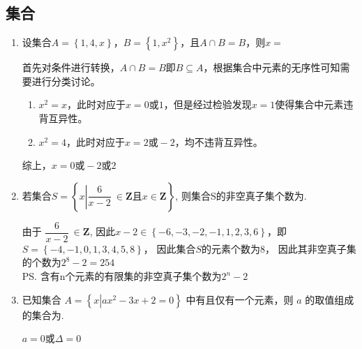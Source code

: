 \subsection*{集合}
\begin{enumerate}
    \item 设集合$A = \left\{1, 4, x\right\}$，$B = \left\{1, x^2\right\}$，且$A \cap B = B$，则$x = $
    \begin{jieda}
        首先对条件进行转换，$A \cap B = B$即$B \subseteq A$，根据集合中元素的无序性可知需要进行分类讨论。
        \begin{enumerate}
            \item $x^2 = x$，此时对应于$x = 0 \mbox{或} 1$，但是经过检验发现$x = 1$使得集合中元素违背互异性。
            \item $x^2 = 4$，此时对应于$x = 2 \mbox{或} -2$，均不违背互异性。
        \end{enumerate}
        综上，$x = 0 \mbox{或} -2 \mbox{或} 2$
    \end{jieda}
    \item 若集合$S = \left\{x \left| \dfrac{6}{x-2}\ \in \mathbf{Z} \mbox{且} x \in \mathbf{Z}\right. \right\}$, 则集合S的非空真子集个数为.
    \begin{jieda}
        由于 $\dfrac{6}{x-2}\ \in \mathbf{Z}$, 因此$x-2 \in \left\{-6, -3, -2, -1, 1, 2, 3, 6\right\}$，即 $S = \left\{-4, -1, 0, 1, 3, 4, 5, 8\right\}$， 因此集合$S$的元素个数为8， 因此其非空真子集的个数为$2^8-2=254$ \\
        \ps 含有n个元素的有限集的非空真子集个数为$2^n -2$
    \end{jieda}

    \item 已知集合 $A = \left\{  {x\left| {a{x}^{2} - {3x} + 2 = 0}\right. }\right\}$ 中有且仅有一个元素，则 $a$ 的取值组成的集合为.
    \begin{jieda}
        $a = 0$或$\Delta = 0$
    \end{jieda}


\end{enumerate}
